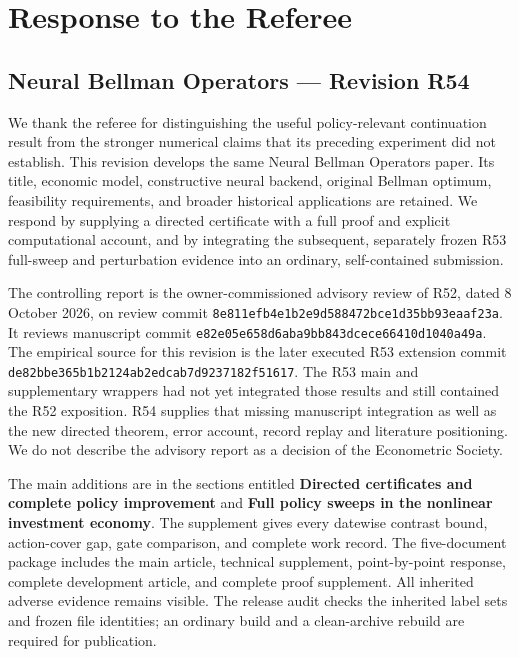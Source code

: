 \hypertarget{response-to-the-referee}{%
\section{Response to the Referee}\label{response-to-the-referee}}

\hypertarget{neural-bellman-operators-revision-r54}{%
\subsection{Neural Bellman Operators --- Revision
R54}\label{neural-bellman-operators-revision-r54}}

We thank the referee for distinguishing the useful policy-relevant
continuation result from the stronger numerical claims that its
preceding experiment did not establish. This revision develops the same
Neural Bellman Operators paper. Its title, economic model, constructive
neural backend, original Bellman optimum, feasibility requirements, and
broader historical applications are retained. We respond by supplying a
directed certificate with a full proof and explicit computational
account, and by integrating the subsequent, separately frozen R53
full-sweep and perturbation evidence into an ordinary, self-contained
submission.

The controlling report is the owner-commissioned advisory review of R52,
dated 8 October 2026, on review commit
\texttt{8e811efb4e1b2e9d588472bce1d35bb93eaaf23a}. It reviews manuscript
commit \texttt{e82e05e658d6aba9bb843dcece66410d1040a49a}. The empirical
source for this revision is the later executed R53 extension commit
\texttt{de82bbe365b1b2124ab2edcab7d9237182f51617}. The R53 main and
supplementary wrappers had not yet integrated those results and still
contained the R52 exposition. R54 supplies that missing manuscript
integration as well as the new directed theorem, error account, record
replay and literature positioning. We do not describe the advisory
report as a decision of the Econometric Society.

The main additions are in the sections entitled \textbf{Directed
certificates and complete policy improvement} and \textbf{Full policy
sweeps in the nonlinear investment economy}. The supplement gives every
datewise contrast bound, action-cover gap, gate comparison, and complete
work record. The five-document package includes the main article,
technical supplement, point-by-point response, complete development
article, and complete proof supplement. All inherited adverse evidence
remains visible. The release audit checks the inherited label sets and
frozen file identities; an ordinary build and a clean-archive rebuild
are required for publication.

